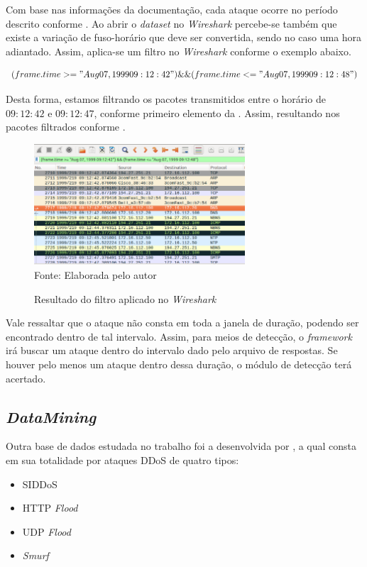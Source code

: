  Com base nas informações da documentação, cada ataque ocorre no período descrito conforme .  Ao abrir o \textit{dataset} no \textit{Wireshark} percebe-se também que existe a variação de fuso-horário que deve ser convertida, sendo no caso uma hora adiantado. Assim, aplica-se um filtro no \textit{Wireshark} conforme o exemplo abaixo.
 
 \begin{equation}
 	(frame.time >= "Aug 07, 1999 09:12:42") \&\& (frame.time <= "Aug 07, 1999 09:12:48")
 \end{equation} 
 
 Desta forma, estamos filtrando os pacotes transmitidos entre o horário de $09:12:42$ e $09:12:47$, conforme primeiro elemento da . Assim, resultando nos pacotes filtrados conforme .

 \begin{figure}[ht]
 	\centering
 	\caption{Resultado do filtro aplicado no \textit{Wireshark} }
 	\includegraphics[width=0.7\textwidth]{figs/filtWireshark1.png}\\
 	{Fonte: Elaborada pelo autor}
 	\label{fig:wiresharkFilt}
 \end{figure} 
 
Vale ressaltar que o ataque não consta em toda a janela de duração, podendo ser encontrado dentro de tal intervalo. Assim, para meios de detecção, o \textit{framework} irá buscar um ataque dentro do intervalo dado pelo arquivo de respostas. Se houver pelo menos um ataque dentro dessa duração, o módulo de detecção terá acertado.
\subsection{\textit{DataMining}}
Outra base de dados estudada no trabalho foi a desenvolvida por \cite{DataMining}, a qual consta em sua totalidade por ataques DDoS de quatro tipos:
\begin{itemize}
	\item SIDDoS
	\item HTTP \textit{Flood}
	\item UDP \textit{Flood}
	\item \textit{Smurf}
\end{itemize}

